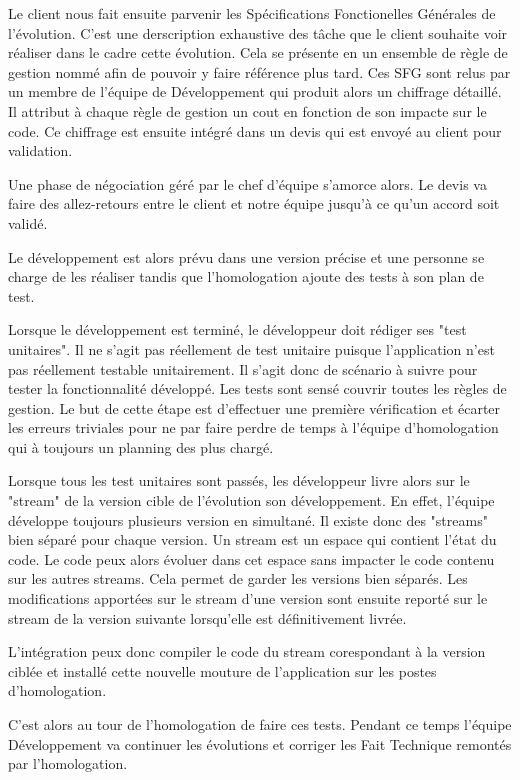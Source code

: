     Le client nous fait ensuite parvenir les Spécifications Fonctionelles Générales de l'évolution. C'est une derscription exhaustive des tâche que le client souhaite voir réaliser dans le cadre cette évolution. Cela se présente en un ensemble de règle de gestion nommé afin de pouvoir y faire référence plus tard. Ces SFG sont relus par un membre de l'équipe de Développement qui produit alors un chiffrage détaillé. Il attribut à chaque règle de gestion un cout en fonction de son impacte sur le code. Ce chiffrage est ensuite intégré dans un devis qui est envoyé au client pour validation.
    
    Une phase de négociation géré par le chef d'équipe s'amorce alors. Le devis va faire des allez-retours entre le client et notre équipe jusqu'à ce qu'un accord soit validé.
    
    Le développement est alors prévu dans une version précise et une personne se charge de les réaliser tandis que l'homologation ajoute des tests à son plan de test.
    
    Lorsque le développement est terminé, le développeur doit rédiger ses "test unitaires". Il ne s'agit pas réellement de test unitaire puisque l'application n'est pas réellement testable unitairement. Il s'agit donc de scénario à suivre pour tester la fonctionnalité développé. Les tests sont sensé couvrir toutes les règles de gestion. Le but de cette étape est d'effectuer une première vérification et écarter les erreurs triviales pour ne par faire perdre de temps à l'équipe d'homologation qui à toujours un planning des plus chargé.
    
    Lorsque tous les test unitaires sont passés, les développeur livre alors sur le "stream" de la version cible de l'évolution son développement. En effet, l'équipe développe toujours plusieurs version en simultané. Il existe donc des "streams" bien séparé pour chaque version. Un stream est un espace qui contient l'état du code. Le code peux alors évoluer dans cet espace sans impacter le code contenu sur les autres streams. Cela permet de garder les versions bien séparés. Les modifications apportées sur le stream d'une version sont ensuite reporté sur le stream de la version suivante lorsqu'elle est définitivement livrée.
    
    L'intégration peux donc compiler le code du stream corespondant à la version ciblée et installé cette nouvelle mouture de l'application sur les postes d'homologation.
    
    C'est alors au tour de l'homologation de faire ces tests. Pendant ce temps l'équipe Développement va continuer les évolutions et corriger les Fait Technique remontés par l'homologation.
    
